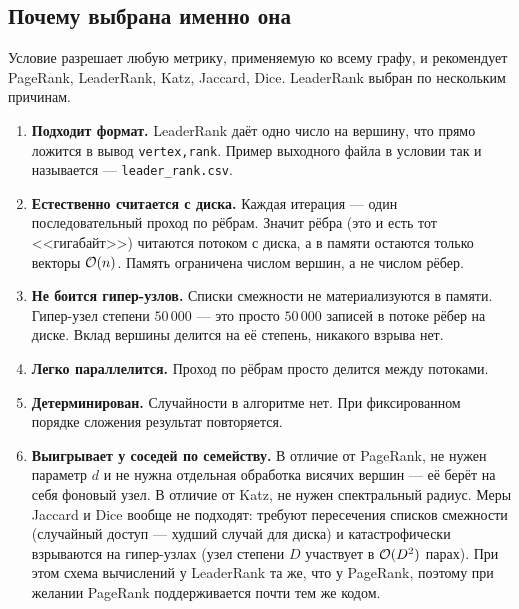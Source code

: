 \subsection{Почему выбрана именно она}
\label{sec:why-leaderrank}
Условие разрешает любую метрику, применяемую ко всему графу, и рекомендует PageRank, LeaderRank,
Katz, Jaccard, Dice. LeaderRank выбран по нескольким причинам.
\begin{enumerate}[itemsep=3pt]
  \item \textbf{Подходит формат.} LeaderRank даёт одно число на вершину, что прямо ложится в вывод
        \texttt{vertex,rank}. Пример выходного файла в условии так и называется ---
        \texttt{leader\_rank.csv}.
  \item \textbf{Естественно считается с диска.} Каждая итерация --- один последовательный проход по
        рёбрам. Значит рёбра (это и есть тот <<гигабайт>>) читаются потоком с диска, а в памяти
        остаются только векторы $\mathcal{O}(n)$. Память ограничена числом вершин, а не числом рёбер.
  \item \textbf{Не боится гипер-узлов.} Списки смежности не материализуются в памяти. Гипер-узел
        степени $50\,000$ --- это просто $50\,000$ записей в потоке рёбер на диске. Вклад вершины
        делится на её степень, никакого взрыва нет.
  \item \textbf{Легко параллелится.} Проход по рёбрам просто делится между потоками.
  \item \textbf{Детерминирован.} Случайности в алгоритме нет. При фиксированном порядке сложения
        результат повторяется.
  \item \textbf{Выигрывает у соседей по семейству.} В отличие от PageRank, не нужен параметр $d$ и
        не нужна отдельная обработка висячих вершин --- её берёт на себя фоновый узел. В отличие от
        Katz, не нужен спектральный радиус. Меры Jaccard и Dice вообще не подходят: требуют пересечения списков смежности (случайный доступ --- худший случай
        для диска) и катастрофически взрываются на гипер-узлах (узел степени $D$ участвует в
        $\mathcal{O}(D^2)$ парах). При этом схема вычислений у LeaderRank та же, что у PageRank, поэтому при
        желании PageRank поддерживается почти тем же кодом.
\end{enumerate}
